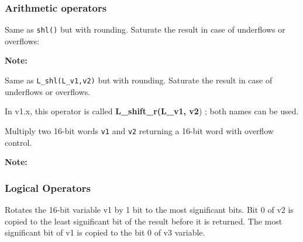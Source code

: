 \subsubsection{Arithmetic operators}


Same as {\tt shl()} but with rounding. Saturate the result in case
of underflows or overflows:


\textbf{Note:} \hfill {}



Same as {\tt L\_shl(L\_v1,v2)} but with rounding. Saturate the
result in case of underflows or overflows.


In v1.x, this operator is called \textbf{L\_shift\_r(L\_v1, v2}) ;
both names can be used.


Multiply two 16-bit words {\tt v1} and {\tt v2} returning a 16-bit
word with overflow control.

\textbf{Note:} \hfill {}

\subsubsection{Logical Operators}

 

Rotates the 16-bit variable v1 by 1 bit to the most significant
bits. Bit 0 of v2 is copied to the least significant bit of the
result before it is returned. The most significant bit of v1 is
copied to the bit 0 of v3 variable.

 

